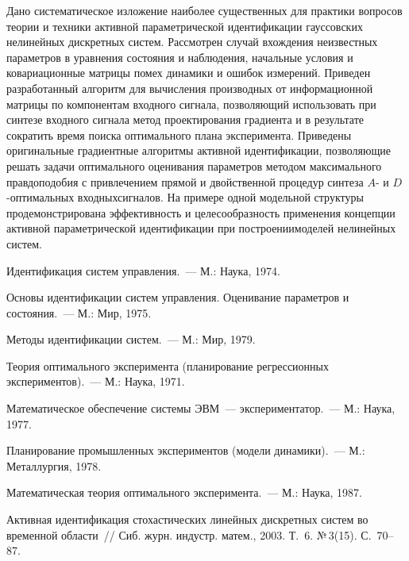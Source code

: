 \begin{multicols}{2}
  Дано систематическое изложение наиболее существенных для практики
вопросов теории и техники активной параметрической идентификации
гауссовских нелинейных дискретных систем. Рассмотрен случай вхождения
неизвестных параметров в уравнения состояния и наблюдения, начальные
условия и ковариационные матрицы помех динамики и ошибок измерений.
Приведен разработанный алгоритм для вычисления производных от
информационной матрицы по компонентам входного сигнала, позволяющий
использовать при синтезе входного сигнала метод проектирования градиента и
в результате сократить время поиска оптимального плана эксперимента.
Приведены оригинальные градиентные алгоритмы активной идентификации,
позволяющие решать задачи оптимального оценивания параметров методом
максимального правдоподобия с привлечением прямой и двойственной
процедур синтеза $A$- и $D$-оп\-ти\-маль\-ных входных\linebreak сигналов. На примере
одной модельной струк\-ту\-ры продемонстрирована эффективность и
це\-ле\-со\-образ\-ность применения концепции активной па\-ра\-мет\-ри\-че\-ской
идентификации при построении\linebreak моделей нелинейных систем.

{\small\frenchspacing
{%
\begin{thebibliography}{99}

Идентификация систем управления.~--- М.: Наука, 1974.

Основы идентификации систем управ\-ле\-ния. Оценивание параметров и
состояния.~--- М.: Мир, 1975.

 Методы идентификации систем.~--- М.: Мир, 1979.

Теория оптимального эксперимента (планирование регрессионных
экспериментов).~--- М.: Наука, 1971.

Математическое обеспечение системы ЭВМ~--- экспериментатор.~--- М.:
Наука, 1977.

Планирование промышленных экспериментов (модели динамики).~--- М.:
Металлургия, 1978.

Математическая теория оптимального эксперимента.~--- М.: Наука, 1987.


Активная идентификация стохастических линейных дискретных систем во
временной области~// Сиб. журн. индустр. матем., 2003. Т.~6. №\,3(15).
С.~70--87.


\end{thebibliography}}}
\end{multicols}
